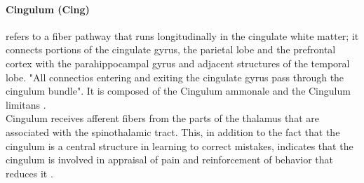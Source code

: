 \documentclass[../structure.tex]{subfiles}
\begin{document}
		\paragraph{Cingulum (Cing)}
		refers to a fiber pathway that runs longitudinally in the cingulate white matter; it connects portions of the cingulate gyrus, the parietal lobe and the prefrontal cortex with the parahippocampal gyrus and adjacent structures of the temporal lobe. "All connectios entering and exiting the cingulate gyrus pass through the cingulum bundle". It is composed of the Cingulum ammonale and the Cingulum limitans \cite{Washington1994}.\\
Cingulum receives afferent fibers from the parts of the thalamus that are associated with the spinothalamic tract. This, in addition to the fact that the cingulum is a central structure in learning to correct mistakes, indicates that the cingulum is involved in appraisal of pain and reinforcement of behavior that reduces it \cite{Brodal2016}.
	
\end{document}
